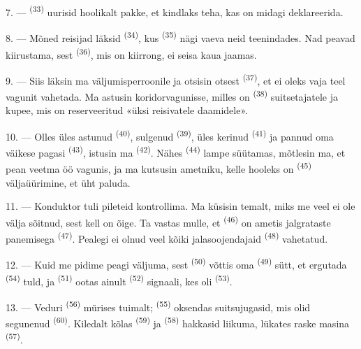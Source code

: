 7. ---  \textsuperscript{(33)} uurisid hoolikalt pakke, et
kindlaks teha, kas on midagi deklareerida.

8. --- Mõned reisijad läksid  \textsuperscript{(34)}, kus
 \textsuperscript{(35)} nägi vaeva neid teenindades. Nad peavad
kiirustama, sest  \textsuperscript{(36)}, mis on kiirrong, ei seisa kaua
jaamas.

9. --- Siis läksin ma väljumisperroonile ja otsisin otsest 
\textsuperscript{(37)}, et ei oleks vaja teel vagunit vahetada. Ma astusin
koridorvagunisse, milles on  \textsuperscript{(38)} suitsetajatele ja kupee,
mis on reserveeritud «üksi reisivatele daamidele».

\VUsaut{3.0mm}

10. --- Olles üles astunud  \textsuperscript{(40)}, sulgenud
 \textsuperscript{(39)}, üles kerinud  \textsuperscript{(41)} ja
pannud oma väikese pagasi  \textsuperscript{(43)}, istusin ma
 \textsuperscript{(42)}. Nähes 
\textsuperscript{(44)} lampe süütamas, mõtlesin ma, et pean veetma öö vagunis, ja ma
kutsusin ametniku, kelle hooleks on  \textsuperscript{(45)}
väljaüürimine, et üht paluda.

11. --- Konduktor tuli pileteid kontrollima. Ma küsisin temalt, miks me veel ei ole
välja sõitnud, sest kell on õige. Ta vastas mulle, et 
\textsuperscript{(46)} on ametis jalgrataste panemisega 
\textsuperscript{(47)}. Pealegi ei olnud veel kõiki jalasoojendajaid
\textsuperscript{(48)} vahetatud.

12. --- Kuid me pidime peagi väljuma, sest  \textsuperscript{(50)} võttis
oma  \textsuperscript{(49)} sütt, et ergutada 
\textsuperscript{(54)} tuld, ja  \textsuperscript{(51)} ootas ainult
 \textsuperscript{(52)} signaali, kes oli 
\textsuperscript{(53)}.

13. --- Veduri  \textsuperscript{(56)} mürises tuimalt;
 \textsuperscript{(55)} oksendas suitsujugasid, mis olid segunenud
 \textsuperscript{(60)}. Kiledalt kõlas 
\textsuperscript{(59)} ja  \textsuperscript{(58)} hakkasid liikuma,
lükates raske masina  \textsuperscript{(57)}.

